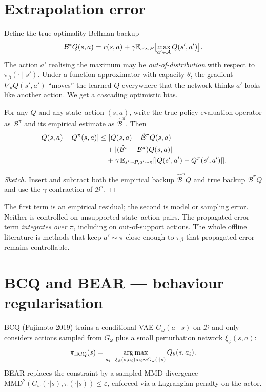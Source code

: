 \documentclass[11pt,oneside]{scrbook}
\begin{document}
\section{Extrapolation error}

Define the true optimality Bellman backup
\[
  \mathcal{B}^* Q(s,a) = r(s,a) + \gamma \mathbb{E}_{s' \sim P}\bigl[\max_{a' \in \mathcal{A}} Q(s', a')\bigr].
\]
The action $a'$ realising the maximum may be \emph{out-of-distribution} with respect
to $\pi_\beta(\cdot \mid s')$. Under a function approximator with capacity $\theta$,
the gradient $\nabla_\theta Q(s', a')$ ``moves'' the learned $Q$ everywhere that the
network thinks $a'$ looks like another action. We get a cascading optimistic bias.

\begin{theorem}
For any $Q$ and any state--action $(s,a)$, write the true
policy-evaluation operator as $\mathcal{B}^\pi$ and its empirical estimate
as $\hat{\mathcal{B}}^\pi$. Then
\begin{align*}
 |Q(s,a)-Q^\pi(s,a)|
 &\le |Q(s,a)-\hat{\mathcal{B}}^\pi Q(s,a)| \\
 &\quad+|(\hat{\mathcal{B}}^\pi-\mathcal{B}^\pi)Q(s,a)| \\
 &\quad+\gamma\,\mathbb{E}_{s'\sim P,a'\sim\pi}[|Q(s',a')-Q^\pi(s',a')|].
\end{align*}
\end{theorem}

\begin{proof}[Sketch]
Insert and subtract both the empirical backup $\hat{\mathcal{B}}^\pi Q$ and true backup $\mathcal{B}^\pi Q$
and use the $\gamma$-contraction of $\mathcal{B}^\pi$.
\end{proof}

The first term is an empirical residual; the second is model or sampling error. Neither is controlled on unsupported state--action pairs. The propagated-error term \emph{integrates over $\pi$}, including
on out-of-support actions. The whole offline literature is methods that keep
$a' \sim \pi$ close enough to $\pi_\beta$ that propagated error remains controllable.

\section{BCQ and BEAR --- behaviour regularisation}

BCQ (Fujimoto 2019) trains a conditional VAE $G_\omega(a \mid s)$ on $\mathcal{D}$ and only
considers actions sampled from $G_\omega$ plus a small perturbation network
$\xi_\phi(s, a)$:
\[
  \pi_{\mathrm{BCQ}}(s) = \operatorname*{arg\,max}_{a_i + \xi_\phi(s, a_i): a_i \sim G_\omega(\cdot \mid s)} Q_\theta(s, a_i).
\]
BEAR replaces the constraint by a sampled MMD divergence
$\mathrm{MMD}^2(G_\omega(\cdot|s), \pi(\cdot|s)) \le \varepsilon$, enforced via a
Lagrangian penalty on the actor.
\end{document}
